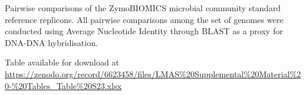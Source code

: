 \begin{table}[]
\centering
\caption{Pairwise comparisons of the ZymoBIOMICS microbial community standard reference replicons. All pairwise comparisons among the set of genomes were conducted using Average Nucleotide Identity through BLAST as a proxy for DNA-DNA hybridisation.}
\label{tab:ch5_suptable23}
Table available for download at \url{https://zenodo.org/record/6623458/files/LMAS\%20Supplemental\%20Material\%20-\%20Tables_Table\%20S23.xlsx}
\end{table}
